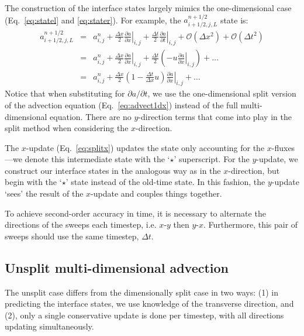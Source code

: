 The construction of the interface states largely mimics the one-dimensional
case (Eq.~\ref{eq:statel} and \ref{eq:stater}).  For example, the
$a_{i+1/2,j,L}^{n+1/2}$ state is:
\begin{eqnarray}
a_{i+1/2,j,L}^{n+1/2} &=& a_{i,j}^n + 
  \frac{\Delta x}{2} \left .\frac{\partial a}{\partial x} \right |_{i,j} + 
  \frac{\Delta t}{2} \left .\frac{\partial a}{\partial t} \right |_{i,j} + 
  \mathcal{O}(\Delta x^2) + \mathcal{O}(\Delta t^2) \nonumber \\
 &=& a_{i,j}^n + 
   \frac{\Delta x}{2} \left .\frac{\partial a}{\partial x} \right |_{i,j} + 
   \frac{\Delta t}{2} \left ( 
   - u \left .\frac{\partial a}{\partial x} \right |_{i,j} \right
   ) + \ldots \nonumber \\
    &=& a_{i,j}^n + 
   \frac{\Delta x}{2} \left ( 1 - \frac{\Delta t}{\Delta x} u \right ) 
   \left .\frac{\partial a}{\partial x} \right |_{i,j} +
   \ldots \label{eq:statels}
\end{eqnarray}
Notice that when substituting for $\partial a / \partial t$, we use
the one-dimensional split version of the advection equation
(Eq.~\ref{eq:advect1dx}) instead of the full multi-dimensional
equation.  There are no $y$-direction terms that come into play in the
split method when considering the $x$-direction.

The $x$-update
(Eq.~\ref{eq:splitx}) updates the state only accounting for the
$x$-fluxes---we denote this intermediate state with the `$\star$'
superscript.  For the $y$-update, we construct our interface states in
the analogous way as in the $x$-direction, but begin with the `$\star$'
state instead of the old-time state.  In this fashion, the $y$-update
`sees' the result of the $x$-update and couples things together.

To achieve second-order accuracy in time, it is necessary to alternate
the directions of the sweeps each timestep, i.e. $x$-$y$ then $y$-$x$.
Furthermore, this pair of sweeps should use the same timestep, $\Delta t$.


\subsection{Unsplit multi-dimensional advection}

The unsplit case differs from the dimensionally split case in two ways:
(1) in predicting the interface states, we use knowledge of the transverse
direction, and (2), only a single conservative update is done per timestep,
with all directions updating simultaneously.

